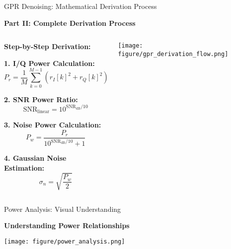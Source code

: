 \documentclass[aspectratio=169]{beamer}
\begin{document}
\begin{frame}{GPR Denoising: Mathematical Derivation Process}
\begin{center}
\textcolor{zjutblue}{\Large \textbf{Part II: Complete Derivation Process}}
\end{center}

\vspace{0.1cm}
\begin{columns}
\begin{column}{0.45\textwidth}
\textbf{Step-by-Step Derivation:}

\vspace{0.1cm}
\textbf{1. I/Q Power Calculation:}
\begin{equation}
P_r = \frac{1}{M}\sum_{k=0}^{M-1}(r_I[k]^2 + r_Q[k]^2)
\end{equation}

\textbf{2. SNR Power Ratio:}
\begin{equation}
\text{SNR}_{\text{linear}} = 10^{\text{SNR}_{\text{dB}}/10}
\end{equation}

\textbf{3. Noise Power Calculation:}
\begin{equation}
P_w = \frac{P_r}{10^{\text{SNR}_{\text{dB}}/10} + 1}
\end{equation}

\textbf{4. Gaussian Noise Estimation:}
\begin{equation}
\sigma_n = \sqrt{\frac{P_w}{2}}
\end{equation}
\end{column}
\begin{column}{0.58\textwidth}
\vspace{-1.2cm}
\texttt{[image: figure/gpr\_derivation\_flow.png]}
\end{column}
\end{columns}
\end{frame}

\begin{frame}{Power Analysis: Visual Understanding}
\begin{center}
\textcolor{zjutblue}{\Large \textbf{Understanding Power Relationships}}
\end{center}

\vspace{0.3cm}
\texttt{[image: figure/power\_analysis.png]}

\vspace{0.3cm}
\begin{center}
\end{center}
\end{frame}
\end{document}
